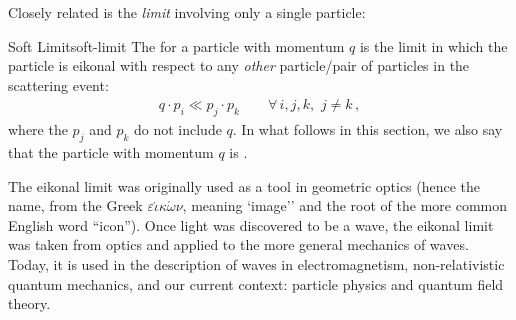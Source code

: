 


Closely related is the \textit{ limit} involving only a single particle:
\begin{definitionbox}{Soft Limit}{soft-limit}
    The  for a particle with momentum \(q\) is the limit in which the particle is eikonal with respect to any \textit{other} particle/pair of particles in the scattering event:
    \begin{align}
        q \cdot p_i \ll p_j \cdot p_k
        \qquad
        \forall\,i,j,k,
        \,\,
        j\neq k
        \,,
    \end{align}
    where the \(p_j\) and \(p_k\) do not include \(q\).
    In what follows in this section, we also say that the particle with momentum \(q\) is .
\end{definitionbox}


The eikonal limit was originally used as a tool in geometric optics (hence the name, from the Greek \(\varepsilon \acute{\iota}\kappa \acute{\omega}\nu\), meaning `image'' and the root of the more common English word ``icon'').
%
Once light was discovered to be a wave, the eikonal limit was taken from optics and applied to the more general mechanics of waves.
%
Today, it is used in the description of waves in electromagnetism, non-relativistic quantum mechanics, and our current context:
%
particle physics and quantum field theory.


